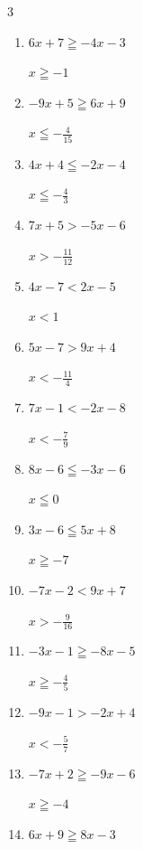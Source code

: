 \begin{multicols}{3}
\begin{enumerate}
        $\displaystyle x>-\frac{2}{3}$

  \item $6x+7\geqq -4x-3$

        $\displaystyle x\geqq -1$

  \item $-9x+5\geqq 6x+9$

        $\displaystyle x\leqq -\frac{4}{15}$

  \item $4x+4\leqq -2x-4$

        $\displaystyle x\leqq -\frac{4}{3}$

  \item $7x+5>-5x-6$

        $\displaystyle x>-\frac{11}{12}$

  \item $4x-7<2x-5$

        $\displaystyle x<1$

  \item $5x-7>9x+4$

        $\displaystyle x<-\frac{11}{4}$

  \item $7x-1<-2x-8$

        $\displaystyle x<-\frac{7}{9}$

  \item $8x-6\leqq -3x-6$

        $\displaystyle x\leqq 0$

  \item $3x-6\leqq 5x+8$

        $\displaystyle x\geqq -7$

  \item $-7x-2<9x+7$

        $\displaystyle x>-\frac{9}{16}$

\columnbreak %

\resetques

  \item $-3x-1\geqq -8x-5$

        $\displaystyle x\geqq -\frac{4}{5}$

  \item $-9x-1>-2x+4$

        $\displaystyle x<-\frac{5}{7}$

  \item $-7x+2\geqq -9x-6$

        $\displaystyle x\geqq -4$

  \item $6x+9\geqq 8x-3$


\end{enumerate}
\end{multicols}
